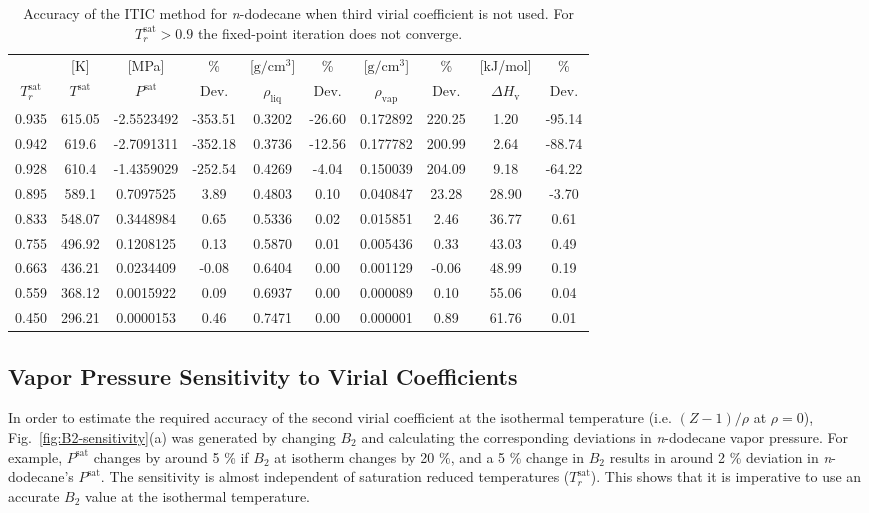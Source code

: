 \documentclass[5p,times]{elsarticle}
\begin{document}
\begin{table}[]
\centering
\caption{Accuracy of the ITIC method for \textit{n}-dodecane when third virial coefficient is not used. For $T_r^{\mathrm{sat}}>0.9$ the fixed-point iteration does not converge.}
\label{tab:NIST-VAL-C12-FTF}
\begin{tabular}{cccccccccc}
 & {[}K{]} &	 {[}MPa{]} &	 \% 	& {[}$\mathrm{g/cm^3}${]} & \% & {[}$\mathrm{g/cm^3}${]} & \% 	& {[}kJ/mol{]} & \% \\
$T_r^{\mathrm{sat}}$ & $T^{\mathrm{sat}}$ & $P^{\mathrm{sat}}$ & Dev. & $\rho_{\mathrm{liq}}$ &	 Dev. & $\rho_{\mathrm{vap}}$ & Dev. & $\Delta H_{\mathrm{v}}$ & Dev. \\
\hline
0.935 & 615.05 & -2.5523492 & -353.51 & 0.3202 & -26.60 & 0.172892 & 220.25 & 1.20  & -95.14 \\
0.942 & 619.6  & -2.7091311 & -352.18 & 0.3736 & -12.56 & 0.177782 & 200.99 & 2.64  & -88.74 \\
0.928 & 610.4  & -1.4359029 & -252.54 & 0.4269 & -4.04  & 0.150039 & 204.09 & 9.18  & -64.22 \\
0.895 & 589.1  & 0.7097525  & 3.89    & 0.4803 & 0.10   & 0.040847 & 23.28  & 28.90 & -3.70  \\
0.833 & 548.07 & 0.3448984  & 0.65    & 0.5336 & 0.02   & 0.015851 & 2.46   & 36.77 & 0.61   \\
0.755 & 496.92 & 0.1208125  & 0.13    & 0.5870 & 0.01   & 0.005436 & 0.33   & 43.03 & 0.49   \\
0.663 & 436.21 & 0.0234409  & -0.08   & 0.6404 & 0.00   & 0.001129 & -0.06  & 48.99 & 0.19   \\
0.559 & 368.12 & 0.0015922  & 0.09    & 0.6937 & 0.00   & 0.000089 & 0.10   & 55.06 & 0.04   \\
0.450 & 296.21 & 0.0000153  & 0.46    & 0.7471 & 0.00   & 0.000001 & 0.89   & 61.76 & 0.01  \\
\end{tabular}

\end{table}

\subsection{Vapor Pressure Sensitivity to Virial Coefficients} \label{sec:Bx-Sensitivity}
In order to estimate the required accuracy of the second virial coefficient at the isothermal temperature (i.e. $(Z-1)/\rho$ at $\rho=0$), Fig.~\ref{fig:B2-sensitivity}(a) was generated by changing $B_2$ and calculating the corresponding deviations in \textit{n}-dodecane vapor pressure. For example, $P^{\mathrm{sat}}$ changes by around 5 \% if $B_2$ at isotherm changes by 20 \%, and a 5 \% change in $B_2$ results in around 2 \% deviation in \textit{n}-dodecane's $P^{\mathrm{sat}}$. The sensitivity is almost independent of saturation reduced temperatures ($T_r^{\mathrm{sat}}$). This shows that it is imperative to use an accurate $B_2$ value at the isothermal temperature.
\end{document}
